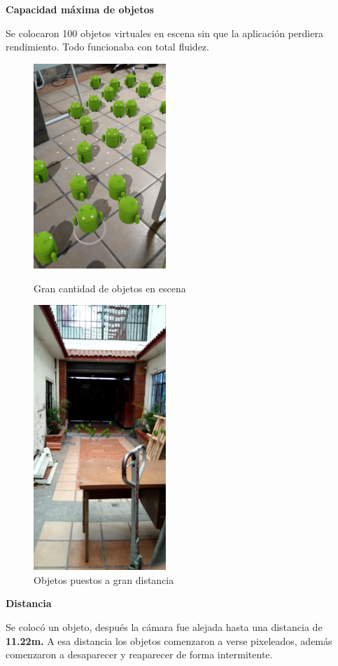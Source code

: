 \textbf{Capacidad máxima de objetos} \par
Se colocaron 100 objetos virtuales en escena sin que la aplicación perdiera rendimiento. Todo funcionaba con total fluidez.

\begin{figure}[H]
	\begin{minipage}{0.48\textwidth}
		\centering
		\includegraphics[width=5cm]{desarrollo/secciones/pruebas/motog6/img/CANTIDAD.png}
		\caption{Gran cantidad de objetos en escena}
		\label{fig:motog6escena}
	\end{minipage}\hfill
	\begin{minipage}{0.48\textwidth}
		
		\centering
		\includegraphics[width=5cm]{desarrollo/secciones/pruebas/motog6/img/DISTANCIA.png}
		\caption{Objetos puestos a gran distancia}
		\label{fig:motog6edistancia}
	\end{minipage}\hfill
\end{figure}

\textbf{Distancia} \par
Se colocó un objeto, después la cámara fue alejada hasta una distancia de \textbf{11.22m.} A esa distancia los objetos comenzaron a verse pixeleados, además comenzaron a desaparecer y reaparecer de forma intermitente.

